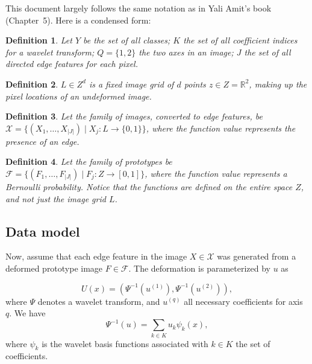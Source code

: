\documentclass{article}
\newtheorem{mydef}{Definition}
\begin{document}
This document largely follows the same notation as in Yali Amit's book (Chapter~5). Here is a condensed form: 

\begin{mydef}
Let $Y$ be the set of all classes; $K$ the set of all coefficient indices for a wavelet transform; $Q = \{1,2\}$ the two axes in an image; $J$ the set of all directed edge features for each pixel.%
\end{mydef}

\begin{mydef}
$L \in Z^{d}$ is a fixed image grid of $d$ points $z \in Z = \mathbb{R}^2$, making up the pixel locations of an undeformed image. %
\end{mydef}

\begin{mydef}
Let the family of images, converted to edge features, be $\mathcal{X} = \{ (X_1, \dots, X_{|J|}) \mid X_j : L \rightarrow \{0,1\}\}$, where the function value represents the presence of an edge.%
\end{mydef}

\begin{mydef}
Let the family of prototypes be $\mathcal{F} = \{ (F_1, \dots, F_{|J|}) \mid F_j : Z \rightarrow [0, 1]\}$, where the function value represents a Bernoulli probability. Notice that the functions are defined on the entire space $Z$, and not just the image grid $L$.
\end{mydef}


\subsection{Data model}
Now, assume that each edge feature in the image $X \in \mathcal{X}$ was generated from a deformed prototype image $F \in \mathcal{F}$. The deformation is parameterized by $u$ as

\[
    U(x) = (\Psi^{-1}(u^{(1)}), \Psi^{-1}(u^{(2)})),
\]
where $\Psi$ denotes a wavelet transform, and $u^{(q)}$ all necessary coefficients for axis $q$. We have
\[
    \Psi^{-1}(u) = \sum_{k\in K} u_k \psi_k(x),
\]
where $\psi_k$ is the wavelet basis functions associated with $k \in K$ the set of coefficients.
\end{document}

